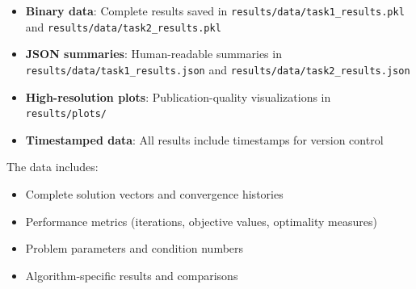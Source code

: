 \documentclass[11pt,a4paper]{article}
\begin{document}
\begin{itemize}
    \item \textbf{Binary data}: Complete results saved in \texttt{results/data/task1\_results.pkl} and \texttt{results/data/task2\_results.pkl}
    \item \textbf{JSON summaries}: Human-readable summaries in \texttt{results/data/task1\_results.json} and \texttt{results/data/task2\_results.json}
    \item \textbf{High-resolution plots}: Publication-quality visualizations in \texttt{results/plots/}
    \item \textbf{Timestamped data}: All results include timestamps for version control
\end{itemize}

The data includes:
\begin{itemize}
    \item Complete solution vectors and convergence histories
    \item Performance metrics (iterations, objective values, optimality measures)
    \item Problem parameters and condition numbers
    \item Algorithm-specific results and comparisons
\end{itemize}
\end{document}
